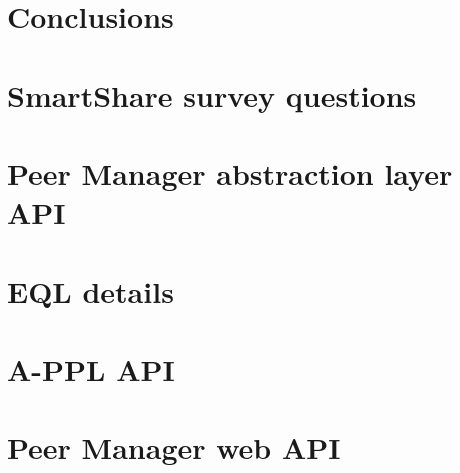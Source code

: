 \documentclass{SmartReport}
\begin{document}
\section{Conclusions}
\label{sec:concl}

\newpage



\clearpage
\appendix
\section{SmartShare survey questions} \label{sec:smartshare-survey}


\newpage
\section{Peer Manager abstraction layer API} \label{sec:pm-abs-api-detail}


\newpage
\section{EQL details} \label{sec:search-annex}


\newpage
\section{A-PPL API} \label{sec:a-ppl-api-detail}


\newpage
\section{Peer Manager web API} \label{sec:pm-web-api-detail}

\end{document}
